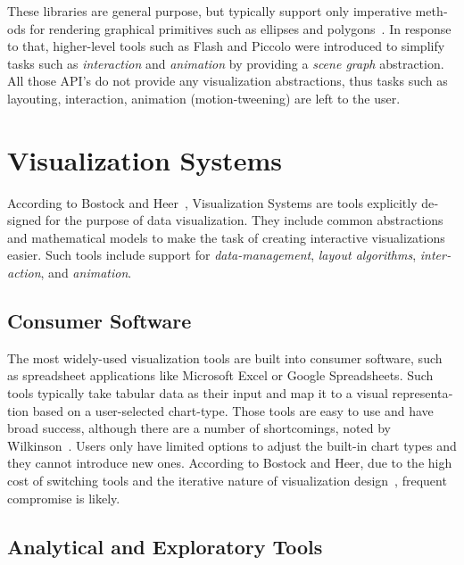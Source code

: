 \begin{english}
These libraries are general purpose, but typically support only imperative methods for rendering graphical primitives such as ellipses and polygons~\cite{Protovis09}. In response to that, higher-level tools such as Flash and Piccolo were introduced to simplify tasks such as \emph{interaction} and \emph{animation} by providing a \emph{scene graph} abstraction. All those API's do not provide any visualization abstractions, thus tasks such as layouting, interaction, animation (motion-tweening) are left to the user.


\section{Visualization Systems}

According to Bostock and Heer~\cite{Protovis09}, Visualization Systems are tools explicitly designed for the purpose of data visualization. They include common abstractions and mathematical models to make the task of creating interactive visualizations easier. Such tools include support for \emph{data-management}, \emph{layout algorithms}, \emph{interaction}, and \emph{animation}.


\subsection{Consumer Software}

The most widely-used visualization tools are built into consumer software, such as spreadsheet applications like Microsoft Excel or Google Spreadsheets. Such tools typically take tabular data as their input and map it to a visual representation based on a user-selected chart-type. Those tools are easy to use and have broad success, although there are a number of shortcomings, noted by Wilkinson~\cite{wilkinson2005grammar}.
Users only have limited options to adjust the built-in chart types and they cannot introduce new ones. According to Bostock and Heer, due to the high cost of switching tools and the iterative nature of visualization design~\cite{card99}, frequent compromise is likely.

\subsection{Analytical and Exploratory Tools}


\end{english}
